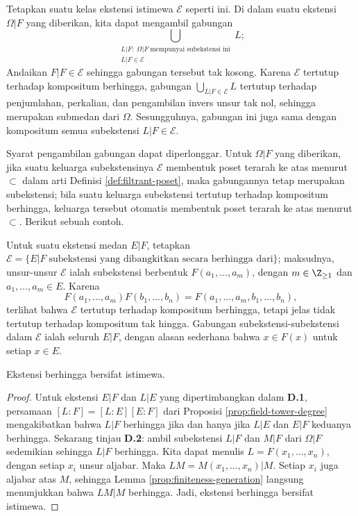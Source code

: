 Tetapkan suatu kelas ekstensi istimewa $\mathcal{E}$ seperti ini. Di dalam suatu ekstensi $\Omega|F$ yang diberikan, kita dapat mengambil gabungan
\[ \bigcup_{\substack{L|F: \; \Omega|F \;\text{mempunyai subekstensi ini} \\ L|F \in \mathcal{E}}} L; \]
Andaikan $F|F \in \mathcal{E}$ sehingga gabungan tersebut tak kosong. Karena $\mathcal{E}$ tertutup terhadap kompositum berhingga, gabungan $\bigcup_{L|F \in \mathcal{E}} L$ tertutup terhadap penjumlahan, perkalian, dan pengambilan invers unsur tak nol, sehingga merupakan submedan dari $\Omega$. Sesungguhnya, gabungan ini juga sama dengan kompositum semua subekstensi $L|F \in \mathcal{E}$.

Syarat pengambilan gabungan dapat diperlonggar. Untuk $\Omega|F$ yang diberikan, jika suatu keluarga subekstensinya $\mathcal{E}$ membentuk poset terarah ke atas menurut $\subset$ dalam arti Definisi \ref{def:filtrant-poset}, maka gabungannya tetap merupakan subekstensi; bila suatu keluarga subekstensi tertutup terhadap kompositum berhingga, keluarga tersebut otomatis membentuk poset terarah ke atas menurut $\subset$. Berikut sebuah contoh.
\begin{example}
	Untuk suatu ekstensi medan $E|F$, tetapkan $\mathcal{E} = \{ E|F\; \text{subekstensi yang dibangkitkan secara berhingga dari} \}$; maksudnya, unsur-unsur $\mathcal{E}$ ialah subekstensi berbentuk $F(a_1, \ldots, a_m)$, dengan $m \in \Z_{\geq 1}$ dan $a_1, \ldots, a_m \in E$. Karena
	\[ F(a_1, \ldots, a_m) F(b_1, \ldots, b_n) = F(a_1, \ldots, a_m, b_1, \ldots, b_n), \]
	terlihat bahwa $\mathcal{E}$ tertutup terhadap kompositum berhingga, tetapi jelas tidak tertutup terhadap kompositum tak hingga. Gabungan subekstensi-subekstensi dalam $\mathcal{E}$ ialah seluruh $E|F$, dengan alasan sederhana bahwa $x \in F(x)$ untuk setiap $x \in E$.
\end{example}

\begin{lemma}\label{prop:finite-ext-dist}
	Ekstensi berhingga bersifat istimewa.
\end{lemma}
\begin{proof}
	Untuk ekstensi $E|F$ dan $L|E$ yang dipertimbangkan dalam \textbf{D.1}, persamaan $[L:F]=[L:E][E:F]$ dari Proposisi \ref{prop:field-tower-degree} mengakibatkan bahwa $L|F$ berhingga jika dan hanya jika $L|E$ dan $E|F$ keduanya berhingga. Sekarang tinjau \textbf{D.2}: ambil subekstensi $L|F$ dan $M|F$ dari $\Omega|F$ sedemikian sehingga $L|F$ berhingga. Kita dapat menulis $L=F(x_1, \ldots, x_n)$, dengan setiap $x_i$ unsur aljabar. Maka $LM = M(x_1, \ldots, x_n)|M$. Setiap $x_i$ juga aljabar atas $M$, sehingga Lemma \ref{prop:finiteness-generation} langsung menunjukkan bahwa $LM|M$ berhingga. Jadi, ekstensi berhingga bersifat istimewa.
\end{proof}

